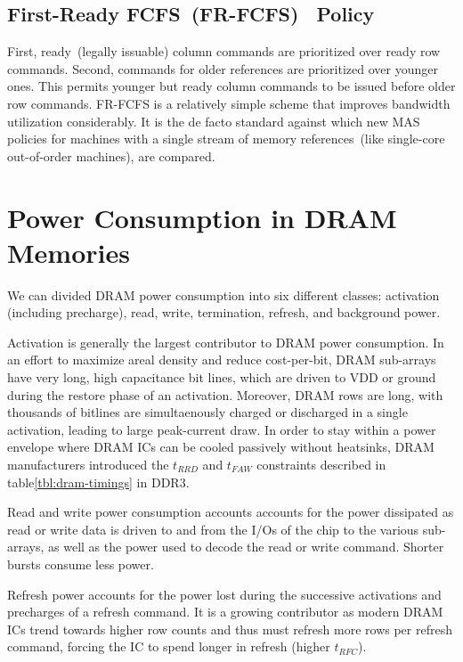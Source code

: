 \subsection{First-Ready FCFS~(FR-FCFS)~\cite{frfcfs} Policy}\label{sec:frfcfs}
First, ready~(legally issuable) column commands are prioritized over ready row
commands. Second, commands for older references are prioritized over younger
ones. This permits younger but ready column commands to be issued before older
row commands. FR-FCFS is a relatively simple scheme that improves bandwidth
utilization considerably. It is the de facto standard against which new MAS
policies for machines with a single stream of memory references~(like
single-core out-of-order machines), are compared.

\section{Power Consumption in DRAM Memories}\label{sec:dram-power}

We can divided DRAM power consumption into six different classes: activation
(including precharge), read, write, termination, refresh, and background power.

Activation is generally the largest contributor to DRAM power consumption.  In an
effort to maximize areal density and reduce cost-per-bit, DRAM sub-arrays have
very long, high capacitance bit lines, which are driven to VDD or ground during
the restore phase of an activation. Moreover, DRAM rows are long, with
thousands of bitlines are simultaenously charged or discharged in a single
activation, leading to large peak-current draw. In order to stay within a power
envelope where DRAM ICs can be cooled passively without heatsinks, DRAM
manufacturers introduced the $t_{RRD}$ and $t_{FAW}$ constraints described in
table\ref{tbl:dram-timings} in DDR3.

Read and write power consumption accounts accounts for the power dissipated as
read or write data is driven to and from the I/Os of the chip to the various
sub-arrays, as well as the power used to decode the read or write command.
Shorter bursts consume less power.

Refresh power accounts for the power lost during the successive activations and
precharges of a refresh command. It is a growing contributor as modern DRAM ICs
trend towards higher row counts and thus must refresh more rows per refresh
command, forcing the IC to spend longer in refresh (higher $t_{RFC}$).

